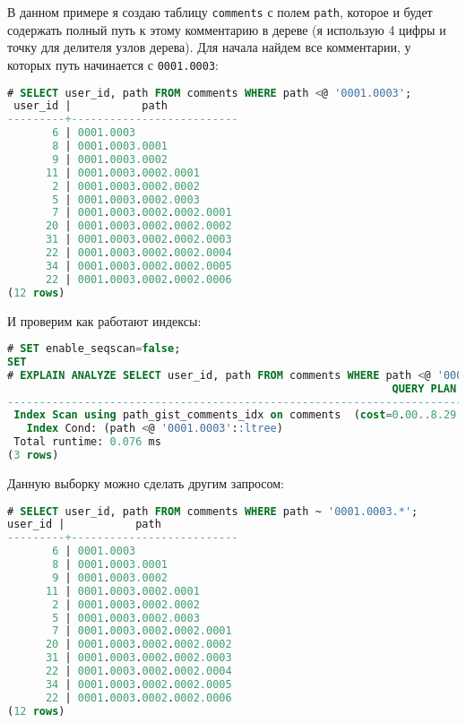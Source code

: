 В данном примере я создаю таблицу \lstinline!comments! с полем \lstinline!path!, которое и будет содержать полный путь к этому комментарию в дереве (я использую 4 цифры и точку для делителя узлов дерева). Для начала найдем все комментарии, у которых путь начинается с \lstinline!0001.0003!:

\begin{lstlisting}[language=SQL,label=lst:pgltree4,caption=Ltree]
# SELECT user_id, path FROM comments WHERE path <@ '0001.0003';
 user_id |           path
---------+--------------------------
       6 | 0001.0003
       8 | 0001.0003.0001
       9 | 0001.0003.0002
      11 | 0001.0003.0002.0001
       2 | 0001.0003.0002.0002
       5 | 0001.0003.0002.0003
       7 | 0001.0003.0002.0002.0001
      20 | 0001.0003.0002.0002.0002
      31 | 0001.0003.0002.0002.0003
      22 | 0001.0003.0002.0002.0004
      34 | 0001.0003.0002.0002.0005
      22 | 0001.0003.0002.0002.0006
(12 rows)
\end{lstlisting}

И проверим как работают индексы:

\begin{lstlisting}[language=SQL,label=lst:pgltree5,caption=Ltree]
# SET enable_seqscan=false;
SET
# EXPLAIN ANALYZE SELECT user_id, path FROM comments WHERE path <@ '0001.0003';
                                                            QUERY PLAN
-----------------------------------------------------------------------------------------------------------------------------------
 Index Scan using path_gist_comments_idx on comments  (cost=0.00..8.29 rows=2 width=38) (actual time=0.023..0.034 rows=12 loops=1)
   Index Cond: (path <@ '0001.0003'::ltree)
 Total runtime: 0.076 ms
(3 rows)
\end{lstlisting}

Данную выборку можно сделать другим запросом:

\begin{lstlisting}[language=SQL,label=lst:pgltree6,caption=Ltree]
# SELECT user_id, path FROM comments WHERE path ~ '0001.0003.*';
user_id |           path
---------+--------------------------
       6 | 0001.0003
       8 | 0001.0003.0001
       9 | 0001.0003.0002
      11 | 0001.0003.0002.0001
       2 | 0001.0003.0002.0002
       5 | 0001.0003.0002.0003
       7 | 0001.0003.0002.0002.0001
      20 | 0001.0003.0002.0002.0002
      31 | 0001.0003.0002.0002.0003
      22 | 0001.0003.0002.0002.0004
      34 | 0001.0003.0002.0002.0005
      22 | 0001.0003.0002.0002.0006
(12 rows)
\end{lstlisting}


